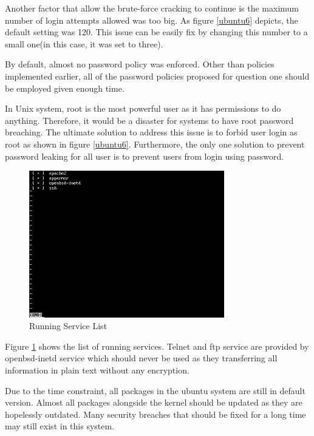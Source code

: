 \documentclass{article}
\begin{document}
Another factor that allow the brute-force cracking to continue is the maximum number of login attempts allowed 
was too big. As figure \ref{ubuntu6} depicts, the default setting was 120. This issue can be easily fix by changing 
this number to a small one(in this case, it was set to three).

By default, almost no password policy was enforced. Other than policies implemented earlier, all of the password policies 
proposed for question one should be employed given enough time.

In Unix system, root is the most powerful user as it has permissions to do anything. Therefore, it would be a disaster for 
systems to have root password breaching. The ultimate solution to address this issue is to forbid user login as root 
as shown in figure \ref{ubuntu6}. Furthermore, the only one solution to prevent password leaking for all user is to 
prevent users from login using password.

\begin{figure}[H]
  \includegraphics[width=8.5cm]{ubuntu3}
  \caption{Running Service List}
  \label{ubuntu3}
\end{figure}
Figure \ref{ubuntu3} shows the list of running services. Telnet and ftp service are provided by openbsd-inetd service 
which should never be used as they transferring all information in plain text without any encryption.

Due to the time constraint, all packages in the ubuntu system are still in default version. Almost all packages 
alongside the kernel should be updated as they are hopelessly outdated. Many security breaches that should be fixed 
for a long time may still exist in this system.




\vfill
\pagebreak

\vfill
\pagebreak



\end{document}
